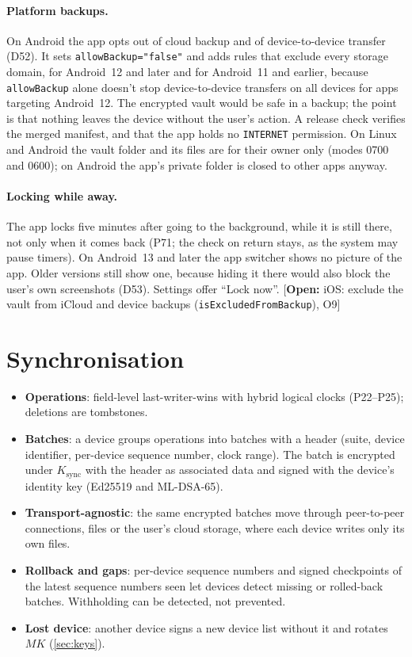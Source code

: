 \documentclass[11pt,a4paper]{article}
\newcommand{\todo}[1]{\textcolor{red!70!black}{[\textbf{Open:} #1]}}
\newcommand{\dref}[1]{\textsf{#1}} %
\begin{document}
\paragraph{Platform backups.} On Android the app opts out of cloud backup and of device-to-device transfer (\dref{D52}). It sets \texttt{allowBackup="false"} and adds rules that exclude every storage domain, for Android~12 and later and for Android~11 and earlier, because \texttt{allowBackup} alone doesn't stop device-to-device transfers on all devices for apps targeting Android~12. The encrypted vault would be safe in a backup; the point is that nothing leaves the device without the user's action. A release check verifies the merged manifest, and that the app holds no \texttt{INTERNET} permission. On Linux and Android the vault folder and its files are for their owner only (modes 0700 and 0600); on Android the app's private folder is closed to other apps anyway.

\paragraph{Locking while away.} The app locks five minutes after going to the background, while it is still there, not only when it comes back (\dref{P71}; the check on return stays, as the system may pause timers). On Android~13 and later the app switcher shows no picture of the app. Older versions still show one, because hiding it there would also block the user's own screenshots (\dref{D53}). Settings offer ``Lock now''. \todo{iOS: exclude the vault from iCloud and device backups (\texttt{isExcludedFromBackup}), \dref{O9}}

\section{Synchronisation}
\label{sec:sync}

\begin{itemize}
  \item \textbf{Operations}: field-level last-writer-wins with hybrid logical clocks (\dref{P22}--\dref{P25}); deletions are tombstones.
  \item \textbf{Batches}: a device groups operations into batches with a header (suite, device identifier, per-device sequence number, clock range). The batch is encrypted under $K_{\mathrm{sync}}$ with the header as associated data and signed with the device's identity key (Ed25519 and ML-DSA-65).
  \item \textbf{Transport-agnostic}: the same encrypted batches move through peer-to-peer connections, files or the user's cloud storage, where each device writes only its own files.
  \item \textbf{Rollback and gaps}: per-device sequence numbers and signed checkpoints of the latest sequence numbers seen let devices detect missing or rolled-back batches. Withholding can be detected, not prevented.
  \item \textbf{Lost device}: another device signs a new device list without it and rotates $MK$ (\cref{sec:keys}).
\end{itemize}
\end{document}

